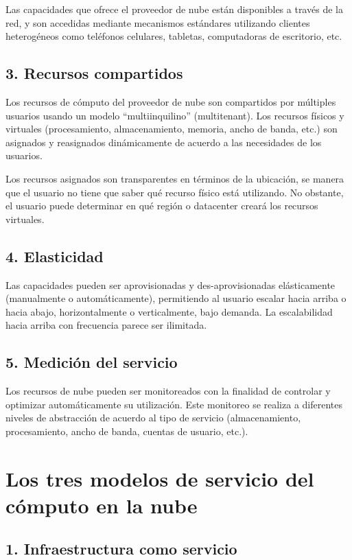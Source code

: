 \documentclass[11pt,a4paper,oneside]{book}
\begin{document}
Las capacidades que ofrece el proveedor de nube están disponibles a través de la red, y son accedidas mediante mecanismos estándares utilizando clientes heterogéneos como teléfonos celulares, tabletas, computadoras de escritorio, etc.

\subsection{3. Recursos compartidos}

Los recursos de cómputo del proveedor de nube son compartidos por múltiples usuarios usando un modelo “multiinquilino” (multitenant). Los recursos físicos y virtuales (procesamiento, almacenamiento, memoria, ancho de banda, etc.) son asignados y reasignados dinámicamente de acuerdo a las necesidades de los usuarios.

Los recursos asignados son transparentes en términos de la ubicación, se manera que el usuario no tiene que saber qué recurso físico está utilizando. No obstante, el usuario puede determinar en qué región o datacenter creará los recursos virtuales.

\subsection{4. Elasticidad}

Las capacidades pueden ser aprovisionadas y des-aprovisionadas elásticamente (manualmente o automáticamente), permitiendo al usuario escalar hacia arriba o hacia abajo, horizontalmente o verticalmente, bajo demanda. La escalabilidad hacia arriba con frecuencia parece ser ilimitada.

\subsection{5. Medición del servicio}

Los recursos de nube pueden ser monitoreados con la finalidad de controlar y optimizar automáticamente su utilización. Este monitoreo se realiza a diferentes niveles de abstracción de acuerdo al tipo de servicio (almacenamiento, procesamiento, ancho de banda, cuentas de usuario, etc.).

\section{Los tres modelos de servicio del cómputo en la nube}

\subsection{1. Infraestructura como servicio}
\end{document}
